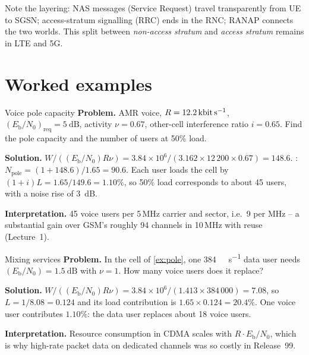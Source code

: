 \documentclass[11pt,a4paper]{article}
\begin{document}
\begin{acnfigure}
  \caption{RRC connection and RAB set-up for a packet service (\cref{proc:rab}).}
  \label{fig:rab}
\end{acnfigure}

Note the layering: NAS messages (Service Request) travel transparently from UE to SGSN;
access-stratum signalling (RRC) ends in the RNC; RANAP connects the two worlds. This split
between \emph{non-access stratum} and \emph{access stratum} remains in LTE and 5G.

\section{Worked examples}

\begin{examplebox}{Voice pole capacity}\label{ex:pole}
\textbf{Problem.} AMR voice, $R=\qty{12.2}{\kilo\bit\per\second}$,
$(E_\mathrm{b}/N_0)_{\mathrm{req}} = \qty{5}{\dB}$, activity $\nu=0.67$, other-cell interference
ratio $i=0.65$. Find the pole capacity and the number of users at 50\% load.

\textbf{Solution.} $W/((E_\mathrm{b}/N_0)R\nu) = 3.84\times10^6/(3.162\times12\,200\times0.67) = 148.6$.
: $N_{\mathrm{pole}} = (1+148.6)/1.65 = 90.6$. Each user loads the cell by
$(1+i)L = 1.65/149.6 = 1.10\%$, so 50\% load corresponds to about 45 users, with a noise
rise of \qty{3}{\dB}.

\textbf{Interpretation.} 45 voice users per 5\,MHz carrier and sector, i.e.\ 9 per MHz -- a
substantial gain over GSM's roughly 94 channels in 10\,MHz with reuse (Lecture~1).
\end{examplebox}

\begin{examplebox}{Mixing services}\label{ex:mix}
\textbf{Problem.} In the cell of \cref{ex:pole}, one \qty{384}{\kilo\bit\per\second} data user
needs $(E_\mathrm{b}/N_0) = \qty{1.5}{\dB}$ with $\nu = 1$. How many voice users does it replace?

\textbf{Solution.} $W/((E_\mathrm{b}/N_0)R\nu) = 3.84\times10^6/(1.413\times384\,000) = 7.08$, so
$L = 1/8.08 = 0.124$ and its load contribution is $1.65\times0.124 = 20.4\%$. One voice user
contributes $1.10\%$: the data user replaces about 18 voice users.

\textbf{Interpretation.} Resource consumption in CDMA scales with $R\cdot E_\mathrm{b}/N_0$, which
is why high-rate packet data on dedicated channels was so costly in Release~99.
\end{examplebox}
\end{document}
